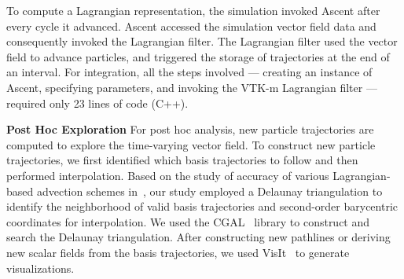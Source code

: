 To compute a Lagrangian representation, the simulation invoked Ascent after every cycle it advanced.
%
Ascent accessed the simulation vector field data and consequently invoked the Lagrangian filter. 
%
The Lagrangian filter used the vector field to advance particles, and triggered the storage of trajectories at the end of an interval.
%
%
For integration, all the steps involved --- creating an instance of Ascent, specifying parameters, and invoking the VTK-m Lagrangian filter --- required only 23 lines of code (C++). %
%
%

\noindent\textbf{Post Hoc Exploration}
For post hoc analysis, new particle trajectories are computed to explore the time-varying vector field. %
%
To construct new particle trajectories, we first identified which basis trajectories to follow and then performed interpolation.
%
Based on the study of accuracy of various Lagrangian-based advection schemes in~\cite{agranovsky2015subsampling}, our study employed a Delaunay triangulation to identify the neighborhood of valid basis trajectories and second-order barycentric coordinates for interpolation.
%
We used the CGAL~\cite{fabri2011cgal} library to construct and search the Delaunay triangulation.
%
After constructing new pathlines or deriving new scalar fields from the basis trajectories, we used VisIt~\cite{childs2012visit} to generate visualizations.

%
%
%
%

